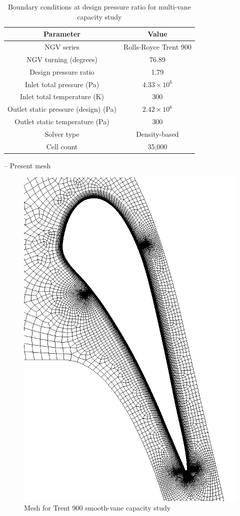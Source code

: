 \documentclass[a4paper, 11pt, twoside]{report}
\begin{document}
\begin{table}[H]
\caption{Boundary conditions at design pressure ratio for multi-vane capacity study}
\label{T900_parameters}
\begin{center}
\begin{tabular}{|c|c|}
\hline
Parameter & Value\\
\hline
NGV series & Rolls-Royce Trent 900\\
NGV turning (degrees) & 76.89\\
Design pressure ratio & 1.79\\
Inlet total pressure (Pa) & $4.33 \times 10^6$\\
Inlet total temperature (K) & 300\\
Outlet static pressure (design) (Pa) & $2.42 \times 10^6$\\
Outlet static temperature (Pa) & 300\\
Solver type & Density-based\\
Cell count & 35,000\\
\hline
\end{tabular}
\end{center}
\end{table}

-- Present mesh
\begin{figure}[H]
      \centering
      \includegraphics[width=.45\textwidth]{figs/T900_smooth_vane_mesh_placeholder.png}
      \caption{Mesh for Trent 900 smooth-vane capacity study}
      \label{fig:T900_mesh_1}
\end{figure}
\end{document}
